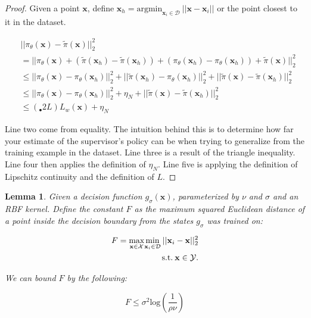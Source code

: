 \documentclass[10pt, conference]{ieeeconf}      %
\newtheorem{lemma}[theorem]{Lemma}
\newcommand{\bx}{\mathbf{x}}
\begin{document}
\begin{proof}
 Given a point $\bx$, define $\bx_h = \mbox{argmin}_{\bx_i \in\mathcal{D}} \: ||\bx - \bx_i||$ or the point closest to it in the dataset. 
 
 \begin{align*}
&||\pi_\theta(\bx) - \tilde{\pi}(\bx)||^2_2\\ 
& = || \pi_\theta(\bx) + (\tilde{\pi}(\bx_h) - \tilde{\pi}(\bx_h)) + (\pi_\theta(\bx_h) - \pi_\theta(\bx_h)) + \tilde{\pi}(\bx)||_2^2\\
& \leq ||\pi_\theta(\bx) - \pi_\theta(\bx_h)||^2_2 + ||\tilde{\pi}(\bx_h) - \pi_\theta(\bx_h)||^2_2+ ||\tilde{\pi}(\bx) - \tilde{\pi}(\bx_h)||^2_2\\
& \leq ||\pi_\theta(\bx) - \pi_\theta(\bx_h)||^2_2 + \eta_N + ||\tilde{\pi}(\bx) - \tilde{\pi}(\bx_h)||^2_2\\
& \leq (_{•}2L)L_w(\bx) + \eta_N
\end{align*}

Line two come from equality. The intuition behind this is to determine how far your estimate of the supervisor's policy can be when trying to generalize from the training example in the dataset. Line three is a result of the triangle inequality. Line four then applies the definition of $\eta_N$. Line five is applying the definition of Lipschitz continuity and the definition of $L$. 


\end{proof}


\begin{lemma}\label{lm:F_bound}
Given a decision function $g_{\sigma}(\bx)$, parameterized by $\nu$ and $\sigma$ and an RBF kernel. Define the constant $F$ as the maximum squared Euclidean  distance of a point inside the decision boundary from the states $g_{\sigma}$ was trained on: 

\vspace{-2ex}
\begin{align*}\label{eq:primal_sup}
   F = \underset{\bx \in \mathcal{X}}{\mbox{max}}\underset{\bx_i \in \mathcal{D} }{\mbox{min}}\: ||\bx_i-\bx||^2_2\\
\mbox{s.t.} \: \bx \in \mathcal{Y} \notag.
\end{align*} 

We can bound $F$ by the following: 

$$F \leq \sigma^2\mbox{log}(\frac{1}{\rho \nu})$$

\end{lemma}
\end{document}
